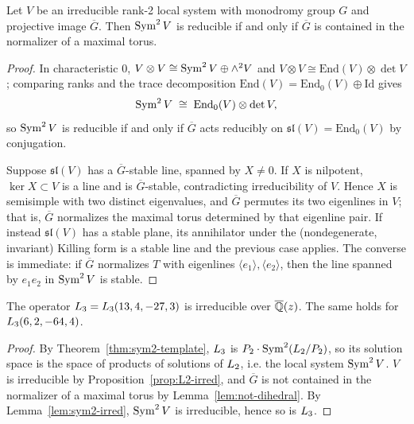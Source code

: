 \begin{lemma}\label{lem:sym2-irred}
Let $V$ be an irreducible rank-2 local system with monodromy group $G$ and
projective image $\overline{G}$. Then $\operatorname{Sym}^2 V$ is reducible if and only if
$\overline{G}$ is contained in the normalizer of a maximal torus.
\end{lemma}

\begin{proof}
In characteristic $0$, $V\otimes V \cong \operatorname{Sym}^2 V \oplus \wedge^2 V$ and
$V \otimes V \cong \mathrm{End}(V)\otimes \det V$; comparing ranks and the
trace decomposition $\mathrm{End}(V) = \mathrm{End}_0(V)\oplus \mathrm{Id}$
gives
\[
  \operatorname{Sym}^2 V \;\cong\; \mathrm{End}_0(V) \otimes \det V ,
\]
so $\operatorname{Sym}^2 V$ is reducible if and only if $\overline{G}$ acts reducibly on
$\mathfrak{sl}(V) = \mathrm{End}_0(V)$ by conjugation.

Suppose $\mathfrak{sl}(V)$ has a $\overline{G}$-stable line, spanned by $X\neq
0$. If $X$ is nilpotent, $\ker X \subset V$ is a line and is
$\overline{G}$-stable, contradicting irreducibility of $V$. Hence $X$ is
semisimple with two distinct eigenvalues, and $\overline{G}$ permutes its two
eigenlines in $V$; that is, $\overline{G}$ normalizes the maximal torus
determined by that eigenline pair. If instead $\mathfrak{sl}(V)$ has a stable
plane, its annihilator under the (nondegenerate, invariant) Killing form is a
stable line and the previous case applies. The converse is immediate: if
$\overline{G}$ normalizes $T$ with eigenlines $\langle e_1\rangle, \langle
e_2\rangle$, then the line spanned by $e_1e_2$ in $\operatorname{Sym}^2 V$ is stable.
\end{proof}

\begin{theorem}\label{thm:L3-irred}
The operator $L_3 = L_3(13,4,-27,3)$ is irreducible over
$\overline{\mathbb{Q}}(z)$. The same holds for $L_3(6,2,-64,4)$.
\end{theorem}

\begin{proof}
By Theorem~\ref{thm:sym2-template}, $L_3$ is $P_2\cdot\operatorname{Sym}^2(L_2/P_2)$,
so its solution space is the space of products of solutions of $L_2$, i.e.
the local system $\operatorname{Sym}^2 V$. $V$ is irreducible by
Proposition~\ref{prop:L2-irred}, and $\overline{G}$ is not contained in the
normalizer of a maximal torus by Lemma~\ref{lem:not-dihedral}. By
Lemma~\ref{lem:sym2-irred}, $\operatorname{Sym}^2 V$ is irreducible, hence so is $L_3$.
\end{proof}

